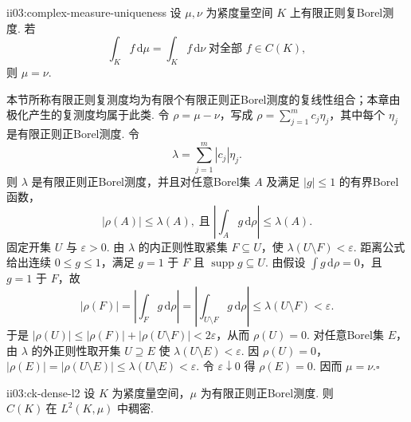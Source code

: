 \begin{FACorollary}[C][正则复测度由连续函数唯一确定]{ii03:complex-measure-uniqueness}
设 \(\displaystyle\mu,\nu\) 为紧度量空间 \(\displaystyle K\) 上有限正则复Borel测度. 若
\[
\int_K f\,\mathrm{d}\mu=\int_K f\,\mathrm{d}\nu
\;\text{对全部 }f\in C(K),
\]
则 \(\displaystyle\mu=\nu\).
\end{FACorollary}

\begin{FAProof}
本节所称有限正则复测度均为有限个有限正则正Borel测度的复线性组合；本章由极化产生的复测度均属于此类. 令 \(\displaystyle\rho=\mu-\nu\)，写成 \(\displaystyle\rho=\sum_{j=1}^m c_j\eta_j\)，其中每个 \(\displaystyle\eta_j\) 是有限正则正Borel测度. 令
\[
\lambda=\sum_{j=1}^m|c_j|\eta_j.
\]
则 \(\displaystyle\lambda\) 是有限正则正Borel测度，并且对任意Borel集 \(\displaystyle A\) 及满足 \(\displaystyle|g|\leqslant1\) 的有界Borel函数，
\[
|\rho(A)|\leqslant\lambda(A),
\;\text{且}\;
\left|\int_A g\,\mathrm{d}\rho\right|\leqslant\lambda(A).
\]
固定开集 \(\displaystyle U\) 与 \(\displaystyle\varepsilon>0\). 由 \(\displaystyle\lambda\) 的内正则性取紧集 \(\displaystyle F\subseteq U\)，使 \(\displaystyle\lambda(U\setminus F)<\varepsilon\). 距离公式给出连续 \(\displaystyle0\leqslant g\leqslant1\)，满足 \(\displaystyle g=1\) 于 \(\displaystyle F\) 且 \(\displaystyle\operatorname{supp}g\subseteq U\). 由假设 \(\displaystyle\int g\,\mathrm{d}\rho=0\)，且 \(\displaystyle g=1\) 于 \(\displaystyle F\)，故
\[
|\rho(F)|
=\left|\int_Fg\,\mathrm{d}\rho\right|
=\left|\int_{U\setminus F}g\,\mathrm{d}\rho\right|
\leqslant\lambda(U\setminus F)
<\varepsilon.
\]
于是 \(\displaystyle|\rho(U)|\leqslant|\rho(F)|+|\rho(U\setminus F)|<2\varepsilon\)，从而 \(\displaystyle\rho(U)=0\). 对任意Borel集 \(\displaystyle E\)，由 \(\displaystyle\lambda\) 的外正则性取开集 \(\displaystyle U\supseteq E\) 使 \(\displaystyle\lambda(U\setminus E)<\varepsilon\). 因 \(\displaystyle\rho(U)=0\)，
\(\displaystyle |\rho(E)|=|\rho(U\setminus E)|\leqslant\lambda(U\setminus E)<\varepsilon.\)
令 \(\displaystyle\varepsilon\downarrow0\) 得 \(\displaystyle\rho(E)=0\). 因而 \(\displaystyle\mu=\nu\).\hfill\(\square\)
\end{FAProof}

\begin{FALemma}{ii03:ck-dense-l2}
设 \(\displaystyle K\) 为紧度量空间，\(\displaystyle\mu\) 为有限正则正Borel测度. 则
\(\displaystyle C(K)\ \text{在 }L^2(K,\mu)\text{ 中稠密}.\)
\end{FALemma}

